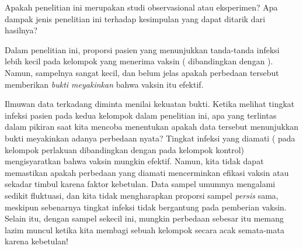 \begin{exercisewrap}
\begin{nexercise}
Apakah penelitian ini merupakan studi observasional atau eksperimen?
Apa dampak jenis penelitian ini terhadap kesimpulan yang dapat
ditarik dari hasilnya?\footnotemark{}
\end{nexercise}
\end{exercisewrap}

Dalam penelitian ini, proporsi pasien yang menunjukkan tanda-tanda
infeksi lebih kecil pada kelompok yang menerima vaksin
(\malariaVIRPerc{} dibandingkan dengan \malariaPIRPerc{}).
Namun, sampelnya sangat kecil,
dan belum jelas apakah perbedaan tersebut memberikan
\emph{bukti meyakinkan} bahwa vaksin itu efektif.

\D{\newpage}

\begin{examplewrap}
\begin{nexample}{Ilmuwan data terkadang diminta
    menilai kekuatan bukti.
    Ketika melihat tingkat infeksi pasien
    pada kedua kelompok dalam penelitian ini,
    apa yang terlintas dalam pikiran saat kita mencoba menentukan apakah
    data tersebut menunjukkan bukti meyakinkan adanya perbedaan nyata?}
  \label{malaria_vaccine_20_what_is_convincing}
  Tingkat infeksi yang diamati
  (\malariaVIRPerc{} pada kelompok perlakuan dibandingkan dengan
  \malariaPIRPerc{} pada kelompok kontrol)
  mengisyaratkan bahwa vaksin mungkin efektif.
  Namun, kita tidak dapat memastikan apakah perbedaan yang diamati
  mencerminkan efikasi vaksin atau sekadar timbul
  karena faktor kebetulan.
  Data sampel umumnya mengalami sedikit fluktuasi, dan kita tidak
  mengharapkan proporsi sampel \emph{persis} sama,
  meskipun sebenarnya tingkat infeksi
  tidak bergantung pada pemberian vaksin.
  Selain itu, dengan sampel sekecil ini,
  mungkin perbedaan sebesar itu memang lazim muncul ketika
  kita membagi sebuah kelompok secara acak semata-mata karena kebetulan!
\end{nexample}
\end{examplewrap}

